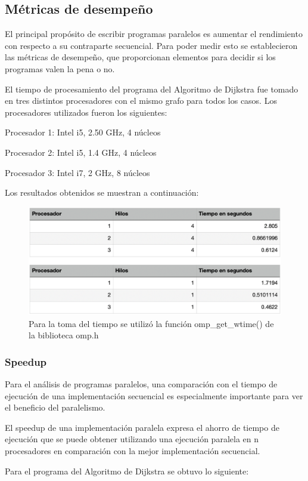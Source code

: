 \documentclass[11pt]{article}
\begin{document}
\subsection{Métricas de desempeño}
El principal propósito de escribir programas paralelos es aumentar el rendimiento con respecto a su contraparte secuencial. Para poder medir esto se establecieron las métricas de desempeño, que proporcionan elementos para decidir si los programas valen la pena o no.
\par
El tiempo de procesamiento del programa del Algoritmo de Dijkstra fue tomado en tres distintos procesadores con el mismo grafo para todos los casos. Los procesadores utilizados fueron los siguientes:
\par
Procesador 1: Intel i5, 2.50 GHz, 4 núcleos
\par
Procesador 2: Intel i5, 1.4 GHz, 4 núcleos
\par
Procesador 3: Intel i7, 2 GHz, 8 núcleos
\par
Los resultados obtenidos se muestran a continuación:

\begin{figure}[!htbp]
\centering
\includegraphics[width=1\linewidth]{tiempo}
\caption{Para la toma del tiempo se utilizó la función omp\_get\_wtime() de la biblioteca omp.h}
\end{figure}

\subsubsection{Speedup}
Para el análisis de programas paralelos, una comparación con el tiempo de ejecución de una implementación secuencial es especialmente importante para ver el beneficio del paralelismo.
\par
El speedup de una implementación paralela expresa el ahorro de tiempo de ejecución que se puede obtener utilizando una ejecución paralela en n procesadores en comparación con la mejor implementación secuencial.
\par
Para el programa del Algoritmo de Dijkstra se obtuvo lo siguiente:
\end{document}
